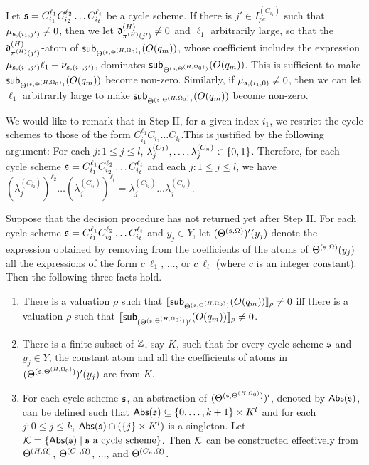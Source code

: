 \medskip

Let $\schm=C_{i_1}^{\ell_1} C_{i_2}^{\ell_2} \dots C_{i_t}^{\ell_t}$ be a cycle scheme. If there is $j' \in I^{(C_{i_1})}_{pe}$ such that $\mu_{\schm,(i_1,j')} \neq 0$, then we let $\vard^{(H)}_{\pi^{(H)}(j')} \neq 0$ and $\ell_1$ arbitrarily large, so that the $\vard^{(H)}_{\pi^{(H)}(j')}$-atom of $\sub{O(q_m)}{\sumf^{(\schm,\sumf^{(H,\initval_0)})}}$, whose coefficient includes the expression $\mu_{\schm, (i_1,j')} \ell_1 + \nu_{\schm, (i_1,j')}$, dominates $\sub{O(q_m)}{\sumf^{(\schm,\sumf^{(H,\initval_0)})}}$. This is sufficient to make $\sub{O(q_m)}{\sumf^{(\schm,\sumf^{(H,\initval_0)})}}$ become non-zero. Similarly, if $\mu_{\schm,(i_1,0)} \neq 0$, then we can let $\ell_1$ arbitrarily large to make $\sub{O(q_m)}{\sumf^{(\schm,\sumf^{(H,\initval_0)})}}$ become non-zero.

\smallskip

We would like to remark that in Step II, for a given index $i_1$, we restrict the cycle schemes to those of the form $C_{i_1}^{\ell_1} C_{i_2} \dots C_{i_t}$.This is justified by the following argument: For each $j: 1 \le j \le l$, $\cstl^{(C_{1})}_j, \dots, \cstl^{(C_{n})}_j \in \{0,1\}$. Therefore, for each cycle scheme $\schm=C_{i_1}^{\ell_1} C_{i_2}^{\ell_2} \dots C_{i_t}^{\ell_t}$ and each $j: 1 \le j \le l$,  we have $(\lambda^{(C_{i_2})}_{j})^{\ell_2} \dots (\lambda^{(C_{i_t})}_{j})^{\ell_t} = \lambda^{(C_{i_2})}_{j} \dots \lambda^{(C_{i_t})}_{j}$.


\begin{proposition}\label{prop-bnd-domain}
Suppose that the decision procedure has not returned yet after Step II. For each cycle scheme $\schm=C_{i_1}^{\ell_1} C_{i_2}^{\ell_2} \dots C_{i_t}^{\ell_t}$ and $y_j \in Y$, let $(\sumf^{(\schm,\initval)})'(y_j)$ denote the expression obtained by removing from the coefficients of the atoms of $\sumf^{(\schm,\initval)}(y_j)$ all the expressions of the form $c\ \ell_1$, $\dots$, or $c\ \ell_t$ (where $c$ is an integer constant).  Then the following three facts hold.
\begin{enumerate}
\item There is a valuation $\rho$ such that $\eval{\sub{O(q_m)}{\sumf^{(\schm, \sumf^{(H,\initval_0)})}}}{\rho}\neq 0$ iff there is a valuation $\rho$ such that $\eval{\sub{O(q_m)}{(\sumf^{(\schm, \sumf^{(H,\initval_0)})})'}}{\rho} \neq 0$.
%
\item There is a finite subset of $\intnum$, say $K$, such that for every cycle scheme $\schm$ and $y_j \in Y$, the constant atom and all the coefficients of atoms in $(\sumf^{(\schm, \sumf^{(H,\initval_0)})})'(y_j)$ are from $K$. 
%
\item For each cycle scheme $\schm$, an abstraction of $(\sumf^{(\schm, \sumf^{(H,\initval_0)})})'$, denoted by $\abs(\schm)$, can be defined such that $\abs(\schm) \subseteq \{0,\dots, k+1\} \times K^l$ and for each $j: 0 \le j \le k$,  $\abs(\schm) \cap (\{j\} \times K^l)$ is a singleton. Let $\Kk=\{\abs(\schm) \mid \schm \mbox{ a cycle scheme}\}$. Then $\Kk$ can be constructed effectively from $\sumf^{(H,\initval)}$, $\sumf^{(C_1,\initval)}$, $\dots$, and $\sumf^{(C_n,\initval)}$.
\end{enumerate}
\end{proposition}


